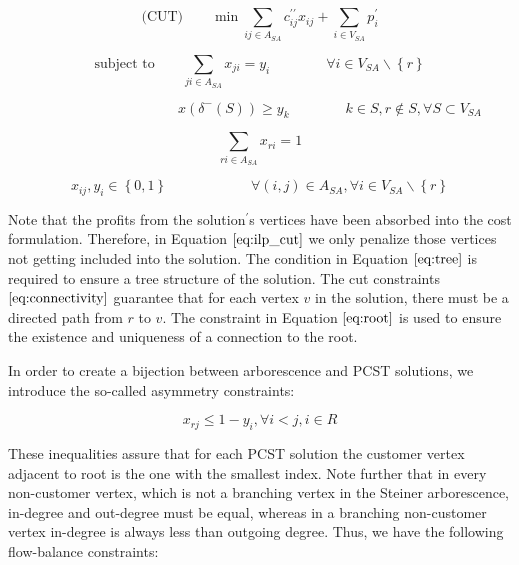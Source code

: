 \documentclass{SMBV12}
\begin{document}
\begin{equation}
\label{eq:ilp_cut}
\mbox{(CUT)} \qquad \min \sum\limits_{ij \in A_{SA}} c_{ij}^{\prime \prime} x_{ij} + \sum\limits_{i \in V_{SA}} p_i^{\prime}
\end{equation}

\begin{equation}
\label{eq:tree}
\mbox{subject to} \qquad \sum\limits_{ji \in A_{SA}} x_{ji} = y_i \qquad \qquad \forall i \in V_{SA} \backslash \left\lbrace r \right\rbrace 
\end{equation}

\begin{equation}
\qquad \qquad \qquad \qquad \qquad x(\delta^-(S)) \geq y_k \qquad \qquad k \in S, r \notin S, \forall S \subset V_{SA}
\label{eq:connectivity}
\end{equation}

\begin{equation}
\sum\limits_{ri \in A_{SA}} x_{ri} = 1
\label{eq:root}
\end{equation}

\begin{equation}
x_{ij}, y_i \in \left\lbrace 0, 1 \right\rbrace \qquad \qquad \qquad \forall (i, j) \in A_{SA}, \forall i \in V_{SA} \backslash \left\lbrace r \right\rbrace 
\end{equation}

Note that the profits from the solution$^{\prime}$s vertices have been absorbed into the cost formulation. Therefore, in Equation $\ref{eq:ilp_cut}$ we only penalize those vertices not getting included into the solution. The condition in Equation $\ref{eq:tree}$ is required to ensure a tree structure of the solution. The cut constraints $\ref{eq:connectivity}$ guarantee that for each vertex $v$ in the solution, there must be a directed path from $r$ to $v$. The constraint in Equation $\ref{eq:root}$ is used to ensure the existence and uniqueness of a connection to the root.

In order to create a bijection between arborescence and PCST solutions, we introduce the so-called asymmetry
constraints:

\begin{equation}
x_{rj} \leq 1 - y_i, \forall i < j, i \in R
\end{equation}

These inequalities assure that for each PCST solution the customer vertex adjacent to root is the one with the
smallest index. Note further that in every non-customer vertex, which is not a branching vertex in the Steiner arborescence, in-degree and out-degree must be equal, whereas in a branching non-customer vertex in-degree is always less than outgoing degree. Thus, we have the following flow-balance constraints:
\end{document}
